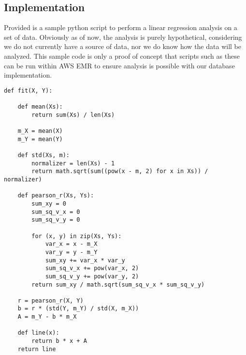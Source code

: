     \subsection{Implementation}
    Provided is a sample python script to perform a linear regression analysis on a set of data. Obviously as of now, the analysis is purely hypothetical, considering we do not currently have a source of data, nor we do know how the data will be analyzed. This sample code is only a proof of concept that scripts such as these can be run within AWS EMR to ensure analysis is possible with our database implementation.
    
\begin{lstlisting}[caption=Sample EMR linear regression analysis example\cite{i5}]
def fit(X, Y):

    def mean(Xs):
        return sum(Xs) / len(Xs)
        
    m_X = mean(X)
    m_Y = mean(Y)

    def std(Xs, m):
        normalizer = len(Xs) - 1
        return math.sqrt(sum((pow(x - m, 2) for x in Xs)) / normalizer)

    def pearson_r(Xs, Ys):
        sum_xy = 0
        sum_sq_v_x = 0
        sum_sq_v_y = 0

        for (x, y) in zip(Xs, Ys):
            var_x = x - m_X
            var_y = y - m_Y
            sum_xy += var_x * var_y
            sum_sq_v_x += pow(var_x, 2)
            sum_sq_v_y += pow(var_y, 2)
        return sum_xy / math.sqrt(sum_sq_v_x * sum_sq_v_y)

    r = pearson_r(X, Y)
    b = r * (std(Y, m_Y) / std(X, m_X))
    A = m_Y - b * m_X

    def line(x):
        return b * x + A
    return line
\end{lstlisting}